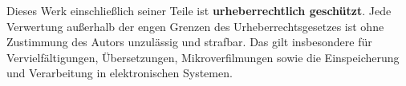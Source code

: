\begin{titlepage}
\singlespacing						%
\small								%
\noindent							%
Dieses Werk einschließlich seiner Teile ist \textbf{urheberrechtlich geschützt}. Jede Verwertung außerhalb der engen Grenzen des Urheberrechtsgesetzes ist ohne Zustimmung des Autors unzulässig und strafbar. Das gilt insbesondere für Vervielfältigungen, Übersetzungen, Mikroverfilmungen sowie die Einspeicherung und Verarbeitung in elektronischen Systemen.

\end{titlepage}